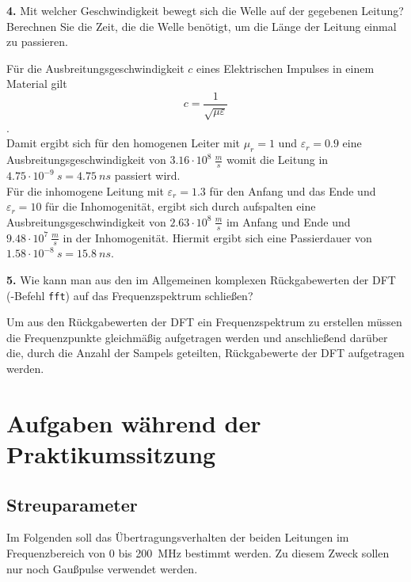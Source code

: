 \documentclass[Protokollheft.tex]{subfiles}
\begin{document}
\begin{framed}
	\noindent \textbf{4.} Mit welcher Geschwindigkeit bewegt sich die Welle auf der gegebenen Leitung? Berechnen Sie die Zeit, die die Welle benötigt, um die Länge der Leitung einmal zu passieren.\label{exer:calcSpeedTime}
\end{framed}
\noindent
Für die Ausbreitungsgeschwindigkeit $c$ eines Elektrischen Impulses in einem Material gilt 
\begin{equation}
 \label{eq:cSpeed}
 c = \frac{1}{\sqrt{\mu \varepsilon}}
\end{equation}.\\
Damit ergibt sich für den homogenen Leiter mit $\mu_r = 1$ und $\varepsilon_r = 0.9$ eine Ausbreitungsgeschwindigkeit von $3.16 \cdot 10^8 \ \si{ \frac{m}{s}}$ womit die Leitung in $4.75\cdot 10^{-9} \  \si{ s} = 4.75 \  \si{ ns}$ passiert wird. \\
Für die inhomogene Leitung mit $\varepsilon_r = 1.3$ für den Anfang und das Ende und $\varepsilon_r = 10$ für die Inhomogenität, ergibt sich durch aufspalten eine Ausbreitungsgeschwindigkeit von $2.63\cdot 10^8 \ \si{\frac{m}{s}}$ im Anfang und Ende und $ 9.48 \cdot 10^7 \ \si{\frac{m}{s}}$ in der Inhomogenität. Hiermit ergibt sich eine Passierdauer von $1.58\cdot 10^{-8} \ \si{s} = 15.8 \ \si{ns}$.

\begin{framed}
	\noindent \textbf{5.} Wie kann man aus den im Allgemeinen komplexen Rückgabewerten der DFT (\matlab-Befehl \verb"fft") auf das Frequenzspektrum schließen?\label{exer:freqSpectByDFT}
\end{framed}
\noindent
Um aus den Rückgabewerten der DFT ein Frequenzspektrum zu erstellen müssen die Frequenzpunkte gleichmäßig aufgetragen werden und anschließend darüber die, durch die Anzahl der Sampels geteilten, Rückgabewerte der DFT aufgetragen werden. 

\section{Aufgaben während der Praktikumssitzung}

{\subsection{Streuparameter}}

\noindent
Im Folgenden soll das Übertragungsverhalten der beiden Leitungen
im Frequenzbereich von $0$ bis \SI{200}{MHz} bestimmt werden. Zu diesem
Zweck sollen nur noch Gaußpulse verwendet werden.
\end{document}
